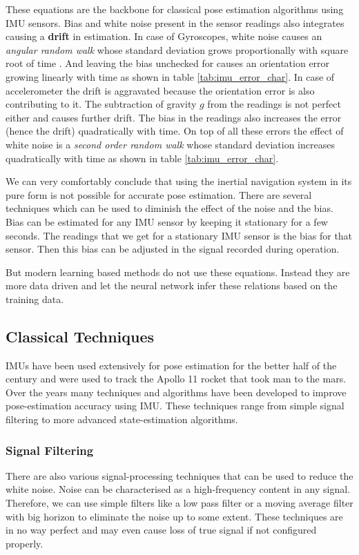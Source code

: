 These equations are the backbone for classical pose estimation algorithms using IMU sensors. Bias and white noise present in the sensor readings also integrates causing a \textbf{drift} in estimation. In case of Gyroscopes, white noise causes an \textit{angular random walk} whose standard deviation grows proportionally with square root of time \citep{woodman2007introduction}. And leaving the bias unchecked for causes an orientation error growing linearly with time as shown in table  \ref{tab:imu_error_char}. In case of accelerometer the drift is aggravated because the orientation error is also contributing to it. The subtraction of gravity $ g $ from the readings is not perfect either and causes further drift. The bias in the readings also increases the error (hence the drift) quadratically with time. On top of all these errors the effect of white noise  is a \textit{second order random walk} whose standard deviation increases quadratically with time as shown in table \ref{tab:imu_error_char}.

We can very comfortably conclude that using the inertial navigation system in its pure form is not possible for accurate pose estimation. There are several techniques which can be used to diminish the effect of the noise and the bias. Bias can be estimated for any IMU sensor by keeping it stationary for a few seconds. The readings that we get for a stationary IMU sensor is the bias for that sensor. Then this bias can be adjusted in the signal recorded during operation.

But modern learning based methods do not use these equations. Instead they are more data driven and let the neural network infer these relations based on the training data.

\subsection{Classical Techniques}
IMUs have been used extensively for pose estimation for the better half of the century and were used to track the Apollo 11 rocket that took man to the mars. Over the years many techniques and algorithms have been developed to improve pose-estimation accuracy using IMU. These techniques range from simple signal filtering to more advanced state-estimation algorithms.

\subsubsection{Signal Filtering}
There are also various signal-processing techniques that can be used to reduce the white noise. Noise can be characterised as a high-frequency content in any signal. Therefore, we can use simple filters like a low pass filter or a moving average filter with big horizon to eliminate the noise up to some extent. These techniques are in no way perfect and may even cause loss of true signal if not configured properly.

